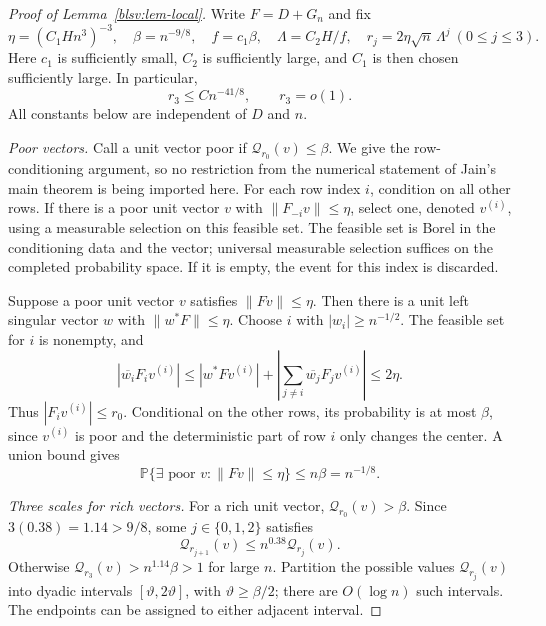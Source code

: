 \documentclass[11pt,reqno]{amsart}
\numberwithin{equation}{section}
\theoremstyle{plain}
\theoremstyle{definition}
\theoremstyle{remark}
\providecommand{\blsvP}{\mathbb P}
\providecommand{\blsvQ}{\mathcal Q}
\begin{document}
\begin{proof}[Proof of Lemma~\ref{blsv:lem-local}]
Write $F=D+G_n$ and fix
\begin{equation}\label{blsv:eq-local-parameters}
 \eta=(C_1Hn^3)^{-3},\quad \beta=n^{-9/8},\quad f=c_1\beta,
 \quad\Lambda=C_2H/f,\quad r_j=2\eta\sqrt n\,\Lambda^j\ (0\le j\le3).
\end{equation}
Here $c_1$ is sufficiently small, $C_2$ is sufficiently large, and $C_1$
is then chosen sufficiently large. In particular,
\begin{equation}\label{blsv:eq-r3}
 r_3\le C n^{-41/8},\qquad r_3=o(1).
\end{equation}
All constants below are independent of $D$ and $n$.

\smallskip\noindent\emph{Poor vectors.}
Call a unit vector poor if $\blsvQ_{r_0}(v)\le\beta$.
We give the row-conditioning argument, so no restriction from the
numerical statement of Jain's main theorem is being imported here.
For each row index $i$, condition on all other rows. If there is a poor
unit vector $v$ with $\|F_{-i}v\|\le\eta$, select one, denoted $v^{(i)}$,
using a measurable selection on this feasible set. The feasible set is
Borel in the conditioning data and the vector; universal measurable
selection suffices on the completed probability space. If it is empty,
the event for this index is discarded.

Suppose a poor unit vector $v$ satisfies $\|Fv\|\le\eta$. Then there is
a unit left singular vector $w$ with $\|w^*F\|\le\eta$. Choose $i$ with
$|w_i|\ge n^{-1/2}$. The feasible set for $i$ is nonempty, and
\[
 |\overline{w_i}F_i v^{(i)}|
 \le |w^*Fv^{(i)}|+
       \left|\sum_{j\ne i}\overline{w_j}F_jv^{(i)}\right|
 \le2\eta.
\]
Thus $|F_iv^{(i)}|\le r_0$. Conditional on the other rows, its probability
is at most $\beta$, since $v^{(i)}$ is poor and the deterministic part of
row $i$ only changes the center. A union bound gives
\begin{equation}\label{blsv:eq-poor}
 \blsvP\{\exists\text{ poor }v:\|Fv\|\le\eta\}\le n\beta=n^{-1/8}.
\end{equation}

\smallskip\noindent\emph{Three scales for rich vectors.}
For a rich unit vector, $\blsvQ_{r_0}(v)>\beta$. Since
$3(0.38)=1.14>9/8$, some $j\in\{0,1,2\}$ satisfies
\begin{equation}\label{blsv:eq-plateau}
 \blsvQ_{r_{j+1}}(v)\le n^{0.38}\blsvQ_{r_j}(v).
\end{equation}
Otherwise $\blsvQ_{r_3}(v)>n^{1.14}\beta>1$ for large $n$.
Partition the possible values $\blsvQ_{r_j}(v)$ into dyadic intervals
$[\vartheta,2\vartheta]$, with $\vartheta\ge\beta/2$; there are $O(\log n)$ such intervals.
The endpoints can be assigned to either adjacent interval.


\end{proof}
\end{document}
